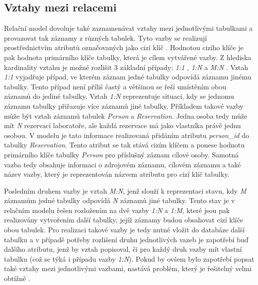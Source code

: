 \documentclass{projekt}
\begin{document}
\subsection{Vztahy mezi relacemi}

\hspace{0.65cm}Relační model dovoluje také zaznamenávat vztahy mezi jednotlivými tabulkami a provazovat tak záznamy z různých tabulek. Tyto vazby se realizují prostřednictvím atributů označovaných jako cizí klíč \cite{_20}. Hodnotou cizího klíče je pak hodnota primárního klíče tabulky, která je cílem vytvářené vazby. Z hlediska kardinality vztahu je možné rozlišit 3 základní případy: {\it 1:1} , {\it 1:N} a {\it M:N} \cite{_22}. Vztah {\it 1:1} vyjadřuje případ, ve kterém záznam jedné tabulky odpovídá záznamu jinému tabulky. Tento případ není příliš častý a většinou se řeší umístěním obou záznamů do jediné tabulky. Vztah {\it 1:N} reprezentuje situaci, kdy se jednomu záznamu tabulky přiřazuje více záznamů jiné tabulky. Příkladem takové vazby může být vztah záznamů tabulek {\it Person} a {\it Reservation}. Jedna osoba tedy může mít {\it N} rezervací laboratoře, ale každá rezervace má jako vlastníka právě jednu osobou. V modelu je tato informace realizovaná přidáním atributu {\it person\_id} do tabulky {\it Reservation}. Tento atribut se tak stává cizím klíčem a ponese hodnotu primárního klíče tabulky {\it Person} pro příslušný záznam cílové osoby. Samotná vazba tedy obsahuje informaci o zdrojovém záznamu, cílovém záznamu a také název vazby, který je reprezentován názvem atributu pro cizí klíč tabulky.

Posledním druhem vazby je vztah {\it M:N}, jenž slouží k reprezentaci stavu, kdy {\it M} záznamům jedné tabulky odpovídá {\it N} záznamů jiné tabulky. Tento stav je v relačním modelu řešen rozložením na dvě vazby {\it 1:N} a {\it 1:M}, které jsou pak realizovány vytvořením další tabulky, jejíž záznamy budou obsahovat cizí klíče obou tabulek. Pro realizaci takové vazby je tedy nutné vložit do databáze další tabulku a v případě potřeby rozlišení druhu jednotlivých vazeb je zapotřebí buď dalšího atributu, jenž by vztah popisoval, či pro každý druh vazby mít vlastní tabulku (což se týká i případu vazby {\it 1:N}). Pokud by ovšem bylo zapotřebí popsat také vztahy mezi jednotlivými vazbami, nastává problém, který je řešitelný velmi obtížně \cite{_20}.
\end{document}
